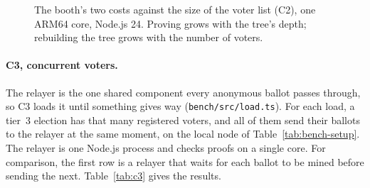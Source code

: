 \begin{figure}[htbp]
  \centering
  \caption{The booth's two costs against the size of the voter list (C2), one
    ARM64 core, Node.js 24. Proving grows with the tree's depth; rebuilding the
    tree grows with the number of voters.}
  \label{fig:c2}
\end{figure}

\paragraph{C3, concurrent voters.}
The relayer is the one shared component every anonymous ballot passes
through, so C3 loads it until something gives way
(\texttt{bench/src/load.ts}). For each load, a tier~3 election has that many
registered voters, and all of them send their ballots to the relayer at the
same moment, on the local node of Table~\ref{tab:bench-setup}. The relayer is
one Node.js process and checks proofs on a single core. For comparison, the
first row is a relayer that waits for each ballot to be mined before sending the
next. Table~\ref{tab:c3} gives the results.

